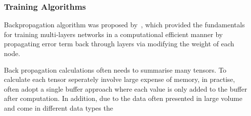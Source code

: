 \subsubsection{Training Algorithms}
Backpropagation algorithm was proposed by~\citet{werbos1975beyond}, which provided the fundamentals for training multi-layers networks in a computational efficient manner by propagating error term back through layers via modifying the weight of each node. 
\par
Back propagation calculations often needs to summarise many tensors. To calculate each tensor seperately involve large expense of memory, in practise, often adopt a single buffer approach where each value is only added to the buffer after computation. In addition, due to the data often presented in large volume and come in different data types the 